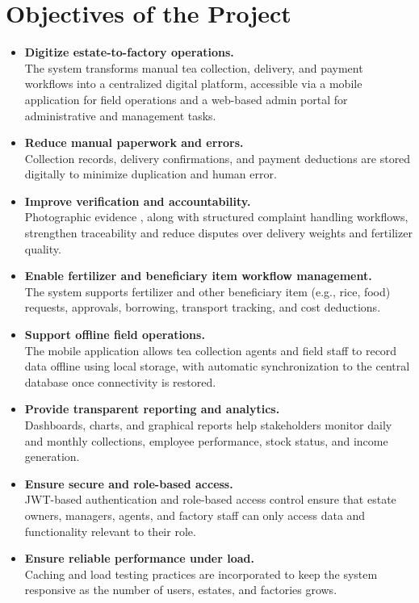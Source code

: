 \section{Objectives of the Project}
\label{sec:objectives}

\begin{itemize}
    \item \textbf{Digitize estate-to-factory operations.} \\The system transforms manual tea collection, delivery, and payment workflows into a centralized digital platform, accessible via a mobile application for field operations and a web-based admin portal for administrative and management tasks.
    \item \textbf{Reduce manual paperwork and errors.} \\Collection records, delivery confirmations, and payment deductions are stored digitally to minimize duplication and human error.
    \item \textbf{Improve verification and accountability.} \\Photographic evidence , along with structured complaint handling workflows, strengthen traceability and reduce disputes over delivery weights and fertilizer quality.
    \item \textbf{Enable fertilizer and beneficiary item workflow management.} \\The system supports fertilizer and other beneficiary item (e.g., rice, food) requests, approvals, borrowing, transport tracking, and cost deductions.
    \item \textbf{Support offline field operations.} \\The mobile application allows tea collection agents and field staff to record data offline using local storage, with automatic synchronization to the central database once connectivity is restored.
    \item \textbf{Provide transparent reporting and analytics.} \\Dashboards, charts, and graphical reports help stakeholders monitor daily and monthly collections, employee performance, stock status, and income generation.
    \item \textbf{Ensure secure and role-based access.} \\JWT-based authentication and role-based access control ensure that estate owners, managers, agents, and factory staff can only access data and functionality relevant to their role.
    \item \textbf{Ensure reliable performance under load.} \\Caching and load testing practices are incorporated to keep the system responsive as the number of users, estates, and factories grows.

\end{itemize}
